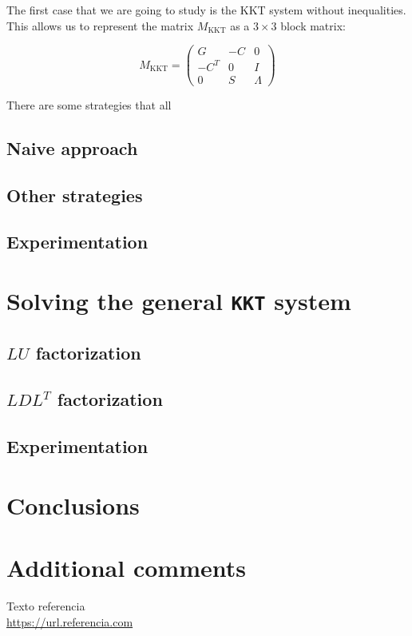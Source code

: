 \documentclass[11pt,a4paper]{article}
\begin{document}
The first case that we are going to study is the KKT system without inequalities.
This allows us to represent the matrix $M_{\text{KKT}}$ as a $3 \times 3$ block
matrix:

\[
  M_{\text{KKT}} =
  \begin{pmatrix}
    G & -C & 0 \\
    -C^T & 0 & I \\
    0 & S & \Lambda
  \end{pmatrix}
\]

There are some strategies that all

\subsection{Naive approach}

\subsection{Other strategies}

\subsection{Experimentation}

\section{Solving the general \texttt{KKT} system}

\subsection{$LU$ factorization}

\subsection{$LDL^T$ factorization}

\subsection{Experimentation}

\section{Conclusions}

\section{Additional comments}

\newpage

\begin{thebibliography}{5}

Texto referencia
\\\url{https://url.referencia.com}

\end{thebibliography}
\end{document}
